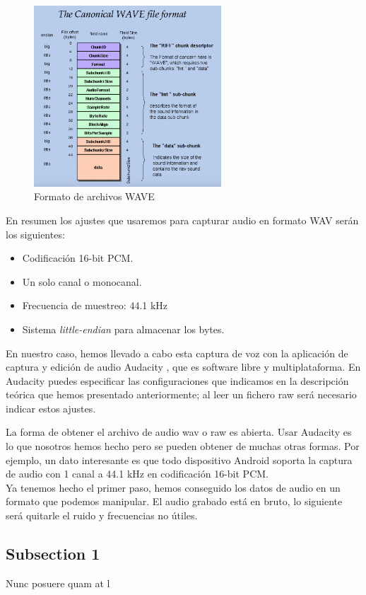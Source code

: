 \begin{figure}[th]
\centering
\includegraphics[width=7cm]{Figures/wave_format}
\decoRule
\caption[waveFormat]{Formato de archivos WAVE}
\label{fig:waveFormat}
\end{figure}

En resumen los ajustes que usaremos para capturar audio en formato WAV serán los siguientes:
\begin{itemize}
\item Codificación 16-bit PCM. 
\item Un solo canal o monocanal.
\item Frecuencia de muestreo: 44.1 kHz
\item Sistema \emph{little-endian} para almacenar los bytes.
\end{itemize}

En nuestro caso, hemos llevado a cabo esta captura de voz con la aplicación de captura y edición de audio Audacity \cite{REF} %
, que es software libre y multiplataforma. En Audacity puedes especificar las configuraciones que indicamos en la descripción teórica que hemos presentado anteriormente; al leer un fichero raw será necesario indicar estos ajustes.

La forma de obtener el archivo de audio wav o raw es abierta. Usar Audacity es lo que nosotros hemos hecho pero se pueden obtener de muchas otras formas. Por ejemplo, un dato interesante es que todo dispositivo Android soporta la captura de audio con 1 canal a 44.1 kHz en codificación 16-bit PCM.\\

Ya tenemos hecho el primer paso, hemos conseguido los datos de audio en un formato que podemos manipular. El audio grabado está en bruto, lo siguiente será quitarle el ruido y frecuencias no útiles.

\subsection{Subsection 1}

Nunc posuere quam at l



